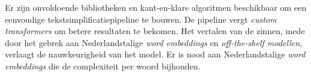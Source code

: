 Er zijn onvoldoende bibliotheken en kant-en-klare algoritmen beschikbaar om een eenvoudige tekstsimplificatiepipeline te bouwen. De pipeline vergt \textit{custom transformers} om betere resultaten te bekomen. Het vertalen van de zinnen, mede door het gebrek aan Nederlandstalige \textit{word embeddings} en \textit{off-the-shelf modellen}, verlaagt de nauwkeurigheid van het model. Er is nood aan Nederlandstalige \textit{word embeddings} die de complexiteit per woord bijhouden. 